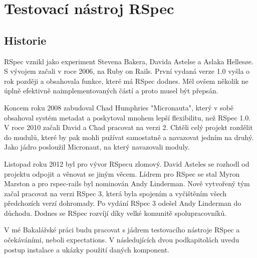 \section {Testovací nástroj RSpec}
\subsection{Historie}
\par RSpec vznikl jako experiment Stevena Bakera, Davida Astelse a Aslaka Hellesøe. S vývojem začali v roce 2006, na Ruby on Rails. První vydaná verze 1.0 vyšla o rok později a obsahovala funkce, které má RSpec dodnes. Měl ovšem několik ne úplně efektivně naimplementovaných částí a proto musel být přepsán.
\par Koncem roku 2008 zabudoval Chad Humphries "Micronauta", který v sobě obsahoval systém metadat a poskytoval mnohem lepší flexibilitu, než RSpec 1.0. V roce 2010 začali David a Chad pracovat na verzi 2. Chtěli celý projekt rozdělit do mudulů, které by pak mohli pužívat samostatně a navazovat jedním na druhý. Jako jádro posloužil Micronaut, na který navazovali moduly.
\par Listopad roku 2012 byl pro vývor RSpecu zlomový. David Asteles se rozhodl od projektu odpojit a věnovat se jiným věcem. Lídrem pro RSpec se stal Myron Marston a pro rspec-rails byl nominován Andy Linderman. Nově vytvořený tým začal pracovat na verzi RSpec 3, která byla spojením a vyčištěním všech předchozích verzí dohromady. Po vydání RSpec 3 odešel Andy Linderman do důchodu. Dodnes se RSpec rozvíjí díky velké komunitě spolupracovníků.
\par V mé Bakalářské práci budu pracovat s jádrem testovacího nástroje RSpec a očekáváními, neboli expectations. V následujících dvou podkapitolách uvedu postup instalace a ukázky použití daných komponent.

